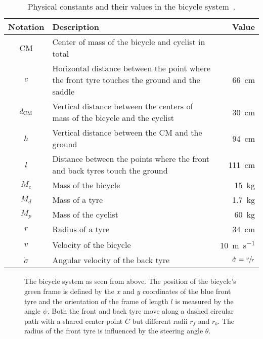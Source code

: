 \begin{table}[p]
    \centering
    \caption{Physical constants and their values in the bicycle system~\cite{randlov_learning_1998}.}
    \label{tab:bicycle_constants}
    \begin{tabularx}{\tablewidth}{cXr}
        \toprule
        Notation & Description & Value \\
        \midrule
        CM & Center of mass of the bicycle and cyclist in total & \\
        $c$ & Horizontal distance between the point where the front tyre touches the ground and the saddle & \SI{66}{\cm} \\
        $d_{\text{CM}}$ & Vertical distance between the centers of mass of the bicycle and the cyclist & \SI{30}{\cm} \\
        $h$ & Vertical distance between the CM and the ground & \SI{94}{\cm} \\
        $l$ & Distance between the points where the front and back tyres touch the ground & \SI{111}{\cm} \\
        $M_c$ & Mass of the bicycle & \SI{15}{\kg} \\
        $M_d$ & Mass of a tyre & \SI{1.7}{\kg} \\
        $M_p$ & Mass of the cyclist & \SI{60}{\kg} \\
        $r$ & Radius of a tyre & \SI{34}{\cm} \\
        $v$ & Velocity of the bicycle & \SI{10}{\m\per\second} \\
        $\dot{\sigma}$ & Angular velocity of the back tyre & $\dot{\sigma} = \sfrac{v}{r}$ \\
        \bottomrule
    \end{tabularx}
\end{table}
\begin{figure}[p]
    \centering
    
    \caption[The bicycle system as seen from above]{
        The bicycle system as seen from above.
        The position of the bicycle's green frame is defined by the $x$ and $y$ coordinates of the blue front tyre and the orientation of the frame of length $l$ is measured by the angle $\psi$.
        Both the front and back tyre move along a dashed circular path with a shared center point $C$ but different radii $r_f$ and $r_b$.
        The radius of the front tyre is influenced by the steering angle $\theta$.
    }
    \label{fig:bicycle:above}
\end{figure}
